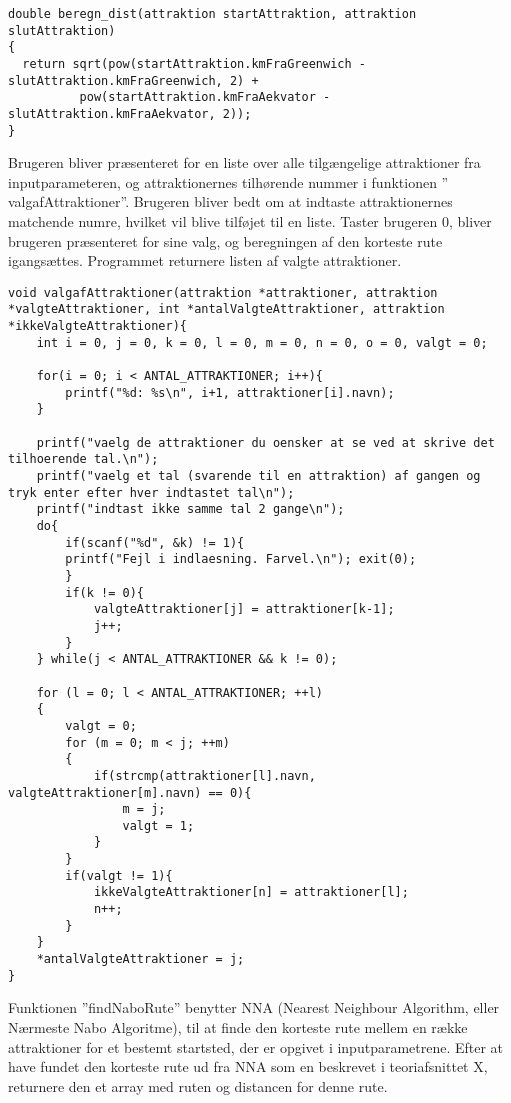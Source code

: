 \begin{lstlisting}
double beregn_dist(attraktion startAttraktion, attraktion slutAttraktion)
{
  return sqrt(pow(startAttraktion.kmFraGreenwich - slutAttraktion.kmFraGreenwich, 2) + 
          pow(startAttraktion.kmFraAekvator - slutAttraktion.kmFraAekvator, 2));
}
\end{lstlisting}


Brugeren bliver præsenteret for en liste over alle tilgængelige attraktioner fra inputparameteren, og attraktionernes tilhørende nummer i funktionen ” valgafAttraktioner”. Brugeren bliver bedt om at indtaste attraktionernes matchende numre, hvilket vil blive tilføjet til en liste. Taster brugeren 0, bliver brugeren præsenteret for sine valg, og beregningen af den korteste rute igangsættes. Programmet returnere listen af valgte attraktioner.

\begin{lstlisting}
void valgafAttraktioner(attraktion *attraktioner, attraktion *valgteAttraktioner, int *antalValgteAttraktioner, attraktion *ikkeValgteAttraktioner){
	int i = 0, j = 0, k = 0, l = 0, m = 0, n = 0, o = 0, valgt = 0;
	
	for(i = 0; i < ANTAL_ATTRAKTIONER; i++){
		printf("%d: %s\n", i+1, attraktioner[i].navn);
	}
	
	printf("vaelg de attraktioner du oensker at se ved at skrive det tilhoerende tal.\n");
	printf("vaelg et tal (svarende til en attraktion) af gangen og tryk enter efter hver indtastet tal\n");
	printf("indtast ikke samme tal 2 gange\n");
	do{
		if(scanf("%d", &k) != 1){
		printf("Fejl i indlaesning. Farvel.\n"); exit(0);
		}
		if(k != 0){
			valgteAttraktioner[j] = attraktioner[k-1];
			j++;
		}
	} while(j < ANTAL_ATTRAKTIONER && k != 0);
	
	for (l = 0; l < ANTAL_ATTRAKTIONER; ++l)
	{
		valgt = 0;
		for (m = 0; m < j; ++m)
		{
			if(strcmp(attraktioner[l].navn, valgteAttraktioner[m].navn) == 0){
				m = j;
				valgt = 1;
			}	
		}
		if(valgt != 1){
			ikkeValgteAttraktioner[n] = attraktioner[l];
			n++;
		}
	}
	*antalValgteAttraktioner = j;
}
\end{lstlisting}
	
Funktionen ”findNaboRute” benytter NNA (Nearest Neighbour Algorithm, eller Nærmeste Nabo Algoritme), til at finde den korteste rute mellem en række attraktioner for et bestemt startsted, der er opgivet i inputparametrene. Efter at have fundet den korteste rute ud fra NNA som en beskrevet i teoriafsnittet X, returnere den et array med ruten og distancen for denne rute. 

